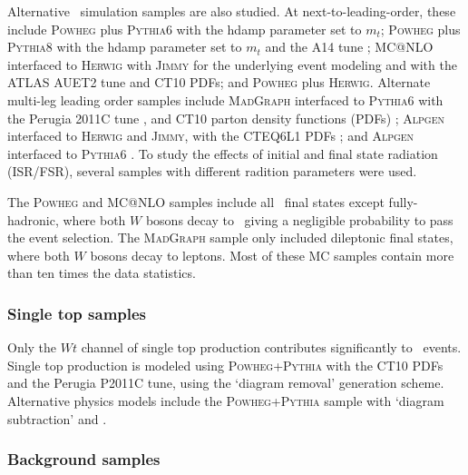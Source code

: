 Alternative \ttbar\ simulation samples are also studied.  At next-to-leading-order, these include \textsc{  Powheg} plus \textsc{  Pythia6}  with the hdamp parameter set to $m_{t}$; \textsc{  Powheg} plus \textsc{  Pythia8} with the hdamp parameter set to $m_{t}$ and the A14 tune ; \textsc{  MC@NLO} \cite{mcatnlo, mcatnlo2} interfaced to \textsc{  Herwig} \cite{Herwig, Herwig1, Herwig2} with \textsc{  Jimmy} \cite{jimmy} for the underlying event modeling and with the ATLAS AUET2 \cite{auet} tune and CT10 PDFs; and \textsc{  Powheg} plus \textsc{  Herwig}. 
Alternate multi-leg leading order samples include \textsc{  MadGraph} \cite{Alwall:2011uj} interfaced to \textsc{  Pythia6} \cite{pythia6} with the Perugia 2011C tune \cite{perugia}, and CT10 parton density functions (PDFs) \cite{cttenpdf}; \textsc{  Alpgen} \cite{alpgen} interfaced to \textsc{  Herwig} and \textsc{  Jimmy}, with
the CTEQ6L1 PDFs \cite{CTEQ}; and \textsc{  Alpgen} interfaced to \textsc{  Pythia6}
. To study the effects of initial and final state radiation (ISR/FSR), several samples with different radition parameters were used.


The \textsc{ Powheg} and \textsc{ MC@NLO} samples include all \ttbar\ final states except fully-hadronic, where both $W$ bosons decay to \qqbar\ giving a negligible probability to pass the event selection. The \textsc{  MadGraph} sample only included dileptonic final states, where both $W$ bosons decay to leptons. Most of these MC samples contain more than ten times the data statistics.

\subsubsection{Single top samples}
Only the $Wt$ channel of single top production contributes significantly to \emubb\ events. Single top production is modeled using \textsc{  Powheg+Pythia} with the CT10 PDFs and the Perugia P2011C tune, using the `diagram removal' \cite{Frixione:2008yi} generation scheme. Alternative physics models include the \textsc{  Powheg+Pythia} sample with `diagram subtraction' \cite{Frixione:2008yi} and \mcnlohw.

\subsubsection{Background samples}\label{ss:mcbkg}

